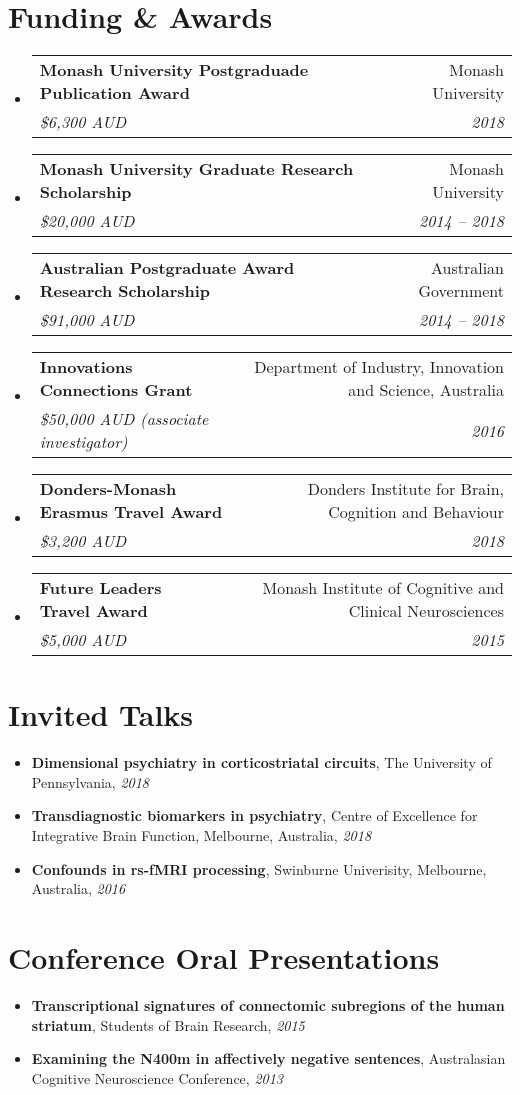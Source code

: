 \documentclass[letterpaper,10pt]{article}
\makeatletter
\newcommand{\resumeSubheading}[4]{
  \vspace{-1pt}\item
    \begin{tabular*}{0.97\textwidth}[t]{l@{\extracolsep{\fill}}r}
      \textbf{#1} & #2 \\
      \textit{\small#3} & \textit{\small #4} \\
    \end{tabular*}\vspace{-5pt}
}
\newcommand{\resumeSubHeadingListStart}{\begin{itemize}[leftmargin=*]}
\newcommand{\resumeSubHeadingListEnd}{\end{itemize}}
\makeatother
\begin{document}


\section{Funding \& Awards}
  \resumeSubHeadingListStart
    \resumeSubheading
      {Monash University Postgraduade Publication Award}{Monash University}
      {\$6,300 AUD}{2018}
    \resumeSubheading
      {Monash University Graduate Research Scholarship}{Monash University}
      {\$20,000 AUD}{2014 -- 2018}
    \resumeSubheading
      {Australian Postgraduate Award Research Scholarship}{Australian Government}
      {\$91,000 AUD}{2014 -- 2018}
    \resumeSubheading
      {Innovations Connections Grant}{Department of Industry, Innovation and Science, Australia}
      {\$50,000 AUD (associate investigator)}{2016}
    \resumeSubheading
      {Donders-Monash Erasmus Travel Award}{Donders Institute for Brain, Cognition and Behaviour}
      {\$3,200 AUD}{2018}
    \resumeSubheading
      {Future Leaders Travel Award}{Monash Institute of Cognitive and Clinical Neurosciences}
      {\$5,000 AUD}{2015}
  \resumeSubHeadingListEnd


\section{Invited Talks}
  \resumeSubHeadingListStart
    \item[] \textbf{Dimensional psychiatry in corticostriatal circuits}, The University of Pennsylvania, \textit{2018}
    \item[] \textbf{Transdiagnostic biomarkers in psychiatry}, Centre of Excellence for Integrative Brain Function, Melbourne, Australia, \textit{2018}
    \item[] \textbf{Confounds in rs-fMRI processing}, Swinburne Univerisity, Melbourne, Australia, \textit{2016}
  \resumeSubHeadingListEnd

\section{Conference Oral Presentations}
  \resumeSubHeadingListStart
    \item[] \textbf{Transcriptional signatures of connectomic subregions of the human striatum}, Students of Brain Research, \textit{2015}
    \item[] \textbf{Examining the N400m in affectively negative sentences}, Australasian Cognitive Neuroscience Conference, \textit{2013}
  \resumeSubHeadingListEnd
\end{document}
